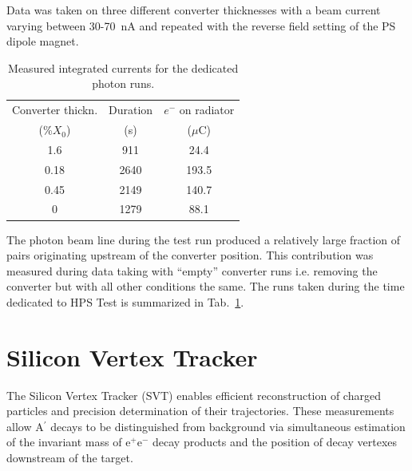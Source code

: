 \documentclass[final,3p,times,twocolumn]{elsarticle}
\newcommand{\Aprime}{A\ensuremath{^\prime}}
\newcommand{\ee}{e$^+$e$^-$}
\begin{document}
 
 Data was taken on three different converter thicknesses with a beam current varying between 
30-70~nA and repeated with the reverse field setting of the PS dipole magnet.
\begin{table}[]
\begin{center}
{\small
\begin{tabular}{|c|c|c|}
\hline
Converter thickn. & Duration &  $e^-$ on radiator \\
 (\%$X_0$) & (s) & ($\mu$C)    \\   
\hline
1.6   & 911 &   24.4 \\ %
0.18   & 2640 &   193.5 \\ %
0.45  & 2149 &     140.7 \\ %
0    & 1279  &   88.1 \\ %
\hline
\end{tabular}
}
\caption{Measured integrated currents for the dedicated photon runs.}
\label{tab:currents}
\end{center}
\end{table}
The photon beam line during the test run produced a relatively large fraction of pairs 
originating upstream of the converter position. This contribution was measured during data taking 
with ``empty'' converter runs i.e. removing the converter but with all other conditions the same. 
The runs taken during the time dedicated to HPS Test is summarized in Tab.~\ref{tab:currents}.




\section{Silicon Vertex Tracker}
\label{svt}

The Silicon Vertex Tracker (SVT) enables efficient reconstruction of charged particles and precision 
determination of their trajectories. These measurements allow \Aprime{} decays to be distinguished 
from background via simultaneous estimation of the invariant mass of \ee{} decay products and the 
position of decay vertexes downstream of the target. 
\end{document}
